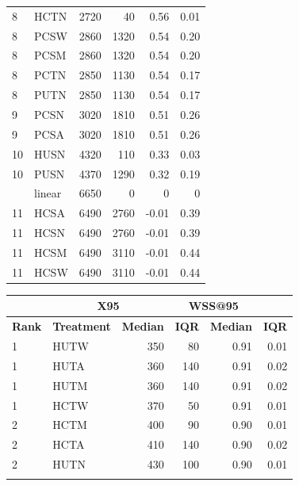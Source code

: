 \documentclass{svjour3}
\theoremstyle{break}
\begin{document}
\begin{table}
\begin{center}
{{\begin{tabular}{l@{~~~}l@{~~~}r@{~~~}r@{~~~}r@{~~~}r}
\rowcolor{red!30}
  8 &         HCTN &    2720  &  40 & 0.56 & 0.01 \\
  8 &         PCSW &    2860  &  1320 & 0.54 & 0.20 \\
  8 &         PCSM &    2860  &  1320 & 0.54 & 0.20 \\
  8 &         PCTN &    2850  &  1130 & 0.54 & 0.17 \\
  8 &         PUTN &    2850  &  1130 & 0.54 & 0.17 \\
\hline  9 &         PCSN &    3020  &  1810 & 0.51 & 0.26 \\
  9 &         PCSA &    3020  &  1810 & 0.51 & 0.26 \\
\hline 10 &         HUSN &    4320  &  110 &  0.33 & 0.03 \\
 10 &         PUSN &    4370  &  1290 & 0.32 & 0.19 \\
 \rowcolor{blue!50}
\hline 11 &       linear &    6650  &  0 & 0 & 0 \\
 11 &         HCSA &    6490  &  2760 & -0.01 & 0.39 \\
 11 &         HCSN &    6490  &  2760 & -0.01 & 0.39 \\
 11 &         HCSM &    6490  &  3110 & -0.01 & 0.44 \\
 11 &         HCSW &    6490  &  3110 & -0.01 & 0.44 \\
\hline \end{tabular}}
}
\parbox{.49\linewidth}{
\centering
{\scriptsize \begin{tabular}{l@{~~~}l@{~~~}r@{~~~}r@{~~~}r@{~~~}r}
\arrayrulecolor{lightgray}
\multicolumn{2}{l}{\textbf{Hall}}  & \multicolumn{2}{c}{\textbf{X95}} & \multicolumn{2}{c}{\textbf{WSS@95}}\\\hline
\textbf{Rank} & \textbf{Treatment} & \textbf{Median} & \textbf{IQR} & \textbf{Median} & \textbf{IQR} \\\hline
  1 &         HUTW &    350  &  80 & 0.91 & 0.01 \\
  1 &         HUTA &    360  &  140 & 0.91 & 0.02 \\
  \rowcolor{green!40}
  1 &         HUTM &    360  &  140 & 0.91 & 0.02 \\
  1 &         HCTW &    370  &  50 & 0.91 & 0.01 \\
\hline  2 &         HCTM &    400  &  90 & 0.90 & 0.01 \\
  2 &         HCTA &    410  &  140 & 0.90 & 0.02 \\
  2 &         HUTN &    430  &  100 & 0.90 & 0.01 \\
  \rowcolor{red!30}

\end{tabular}}}
\end{center}
\end{table}
\end{document}
